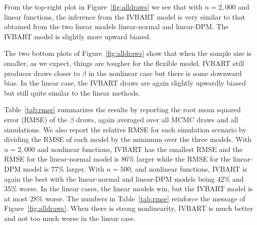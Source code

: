 From the top-right plot in Figure~\ref{fig:alldraws} we see that with $n=2,000$ and linear functions,
the inference from the IVBART model is very similar to that obtained from the two linear models linear-normal and 
linear-DPM.
The IVBART model is slightly more upward biased.

The two bottom plots of Figure~\ref{fig:alldraws} show that when the sample size is smaller, as we expect, 
things are tougher for the flexible model.
IVBART still produces draws closer to $\beta$ in the nonlinear case but there is some downward bias.
In the linear case, the IVBART draws are again slightly upwardly biased but still quite similar to the linear methods.

Table~\ref{tab:rmse} summarizes the results by reporting the root mean squared error (RMSE) of
the $\beta$ draws, again averaged over all MCMC draws and all simulations.
We also report the relative RMSE for each simulation scenario by dividing the RMSE of each model
by the minimum over the three models.
With $n = 2,000$ and nonlinear functions, IVBART has the smallest RMSE and the RMSE for the linear-normal model
is 86\% larger while the RMSE for the linear-DPM model is 77\% larger.
With $n = 500$, and nonlinear functions, IVBART is again the best with the linear-normal and linear-DPM
models being 42\% and 35\% worse.
In the linear cases, the linear models win, but the IVBART model is at most 28\% worse.
The numbers in Table~\ref{tab:rmse} reinforce the message of Figure~\ref{fig:alldraws}.
When there is strong nonlinearity, IVBART is much better and not too much worse in the linear case.

